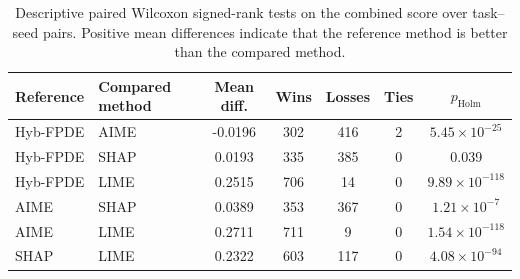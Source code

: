\begin{table}[!tbp]
    \caption{Descriptive paired Wilcoxon signed-rank tests on the combined score over task--seed pairs. Positive mean differences indicate that the reference method is better than the compared method.}
    \label{tab:stat_tests}
    \centering
    \begin{tabular}{llccccc}
        \toprule
        Reference & Compared method & Mean diff. & Wins & Losses & Ties & $p_{\mathrm{Holm}}$  \\
        \midrule
        Hyb-FPDE & AIME & -0.0196 & 302 & 416 & 2 & $5.45\times 10^{-25}$ \\
        Hyb-FPDE & SHAP & 0.0193 & 335 & 385 & 0 & 0.039 \\
        Hyb-FPDE & LIME & 0.2515 & 706 & 14 & 0 & $9.89\times 10^{-118}$ \\
        AIME & SHAP & 0.0389 & 353 & 367 & 0 & $1.21\times 10^{-7}$ \\
        AIME & LIME & 0.2711 & 711 & 9 & 0 & $1.54\times 10^{-118}$ \\
        SHAP & LIME & 0.2322 & 603 & 117 & 0 & $4.08\times 10^{-94}$ \\
        \bottomrule
    \end{tabular}
\end{table}
